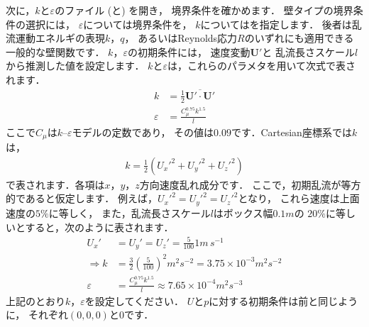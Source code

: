 次に，$k$と$\varepsilon$のファイル (と) を開き，
境界条件を確かめます．
壁タイプの境界条件の選択には，
$\varepsilon$については境界条件を，
$k$についてはを指定します．
後者は乱流運動エネルギの表現$k$，$q$，
あるいはReynolds応力$R$のいずれにも適用できる一般的な壁関数です．
$k$，$\varepsilon$の初期条件には，
速度変動$\bm{U}'$と
%
乱流長さスケール$l$から推測した値を設定します．
$k$と$\varepsilon$は，これらのパラメタを用いて次式で表されます．
\begin{align}
 \label{eq:2.8}
  k &= \frac{1}{2}\overline{\bm{U}' \cdot \bm{U}'} \\
 \label{eq:2.9}
 \varepsilon &= \frac{C_{\mu}^{0.75}k^{1.5}}{l}
\end{align}
ここで$C_{\mu}$は$k$--$\varepsilon$モデルの定数であり，
その値は$0.09$です．Cartesian座標系では$k$は，
\begin{align}
 \label{eq:2.10}
 k = \frac{1}{2}({U_{x}'}^{2} + {U_{y}'}^{2} + {U_{z}'}^{2})
\end{align}
で表されます．各項は$x$，$y$，$z$方向速度乱れ成分です．
ここで，初期乱流が等方的であると仮定します．
例えば，${U_{x}'}^{2} = {U_{y}'}^{2} = {U_{z}'}^{2}$となり，
これら速度は上面速度の$5\unit{\%}$に等しく，
また，乱流長さスケール$l$はボックス幅$0.1\unit{m}$の
$20\unit{\%}$に等しいとすると，次のように表されます．
\begin{align}
 \label{eq:2.11}
 U_{x}' &= U_{y}' = U_{z}' = \frac{5}{100}1\unit{m\,s^{-1}} \\
 \label{eq:2.12}
 \Rightarrow k &= \frac{3}{2}\left(\frac{5}{100}\right)^{2}\unit{m^{2}s^{-2}}
 = 3.75 \times 10^{-3}\unit{m^{2}s^{-2}} \\
 \label{eq:2.13}
 \varepsilon &= \frac{C_{\mu}^{0.75}k^{1.5}}{l}
 \approx 7.65 \times 10^{-4}\unit{m^{2}s^{-3}}
\end{align}
上記のとおり$k$，$\varepsilon$を設定してください．
$U$と$p$に対する初期条件は前と同じように，
それぞれ$(0, 0, 0)$と$0$です．

